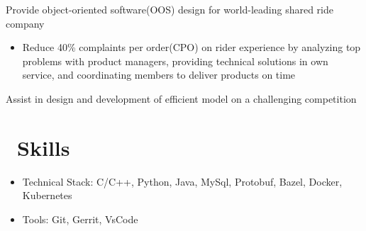 \documentclass{resume}
\begin{document}
Provide object-oriented software(OOS) design for world-leading shared ride company
\begin{itemize}
  \item Reduce 40\% complaints per order(CPO) on rider experience by analyzing top problems with product managers, providing technical solutions in own service, and coordinating members to deliver products on time
\end{itemize}


Assist in design and development of efficient model on a challenging competition


\section{\faCogs\ Skills}
\begin{itemize}[parsep=0.5ex]
  \item Technical Stack: C/C++, Python, Java, MySql, Protobuf, Bazel, Docker, Kubernetes
  \item Tools: Git, Gerrit, VsCode
\end{itemize}

%
%
\end{document}
